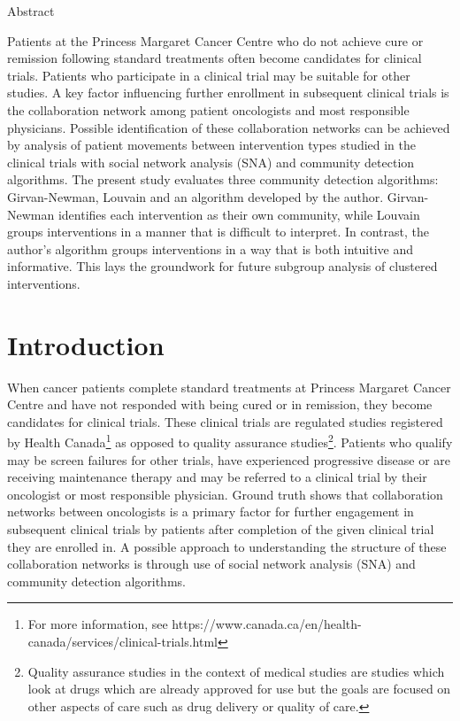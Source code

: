 Abstract

Patients at the Princess Margaret Cancer Centre who do not achieve cure
or remission following standard treatments often become candidates for
clinical trials. Patients who participate in a clinical trial may be
suitable for other studies. A key factor influencing further enrollment
in subsequent clinical trials is the collaboration network among patient
oncologists and most responsible physicians. Possible identification of
these collaboration networks can be achieved by analysis of patient
movements between intervention types studied in the clinical trials with
social network analysis (SNA) and community detection algorithms. The
present study evaluates three community detection algorithms:
Girvan-Newman, Louvain and an algorithm developed by the author.
Girvan-Newman identifies each intervention as their own community, while
Louvain groups interventions in a manner that is difficult to interpret.
In contrast, the author's algorithm groups interventions in a way that
is both intuitive and informative. This lays the groundwork for future
subgroup analysis of clustered interventions.

\section{Introduction}\label{introduction}

When cancer patients complete standard treatments at Princess Margaret
Cancer Centre and have not responded with being cured or in remission,
they become candidates for clinical trials. These clinical trials are
regulated studies registered by Health Canada\footnote{For more
  information, see
  https://www.canada.ca/en/health-canada/services/clinical-trials.html}
as opposed to quality assurance studies\footnote{Quality assurance
  studies in the context of medical studies are studies which look at
  drugs which are already approved for use but the goals are focused on
  other aspects of care such as drug delivery or quality of care.}.
Patients who qualify may be screen failures for other trials, have
experienced progressive disease or are receiving maintenance therapy and
may be referred to a clinical trial by their oncologist or most
responsible physician. Ground truth shows that collaboration networks
between oncologists is a primary factor for further engagement in
subsequent clinical trials by patients after completion of the given
clinical trial they are enrolled in. A possible approach to
understanding the structure of these collaboration networks is through
use of social network analysis (SNA) and community detection algorithms.

